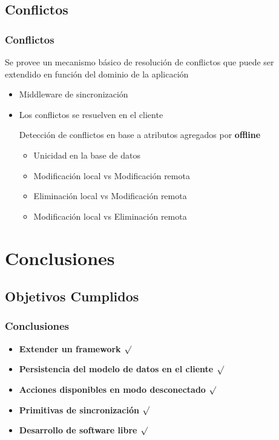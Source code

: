 \documentclass{beamer}
\begin{document}
\subsection{Conflictos}
\begin{frame}
    \frametitle{Conflictos}
    \par{
    Se provee un mecanismo básico de resolución de conflictos que 
    puede ser extendido en función del dominio de la aplicación
    }
    \begin{itemize}
      	\item{Middleware de sincronización}
        \item{Los conflictos se resuelven en el cliente}
        \begin{item}
        \par{
        	Detección de conflictos en base a atributos agregados por
        	{\bf offline}
        }
        \begin{itemize}
          \item{Unicidad en la base de datos}
          \item{Modificación local vs Modificación remota}
          \item{Eliminación local vs Modificación remota}
          \item{Modificación local vs Eliminación remota}
        \end{itemize}
        \end{item}        
    \end{itemize}
\end{frame}

\section{Conclusiones}
\subsection{Objetivos Cumplidos}
\begin{frame}
    \frametitle{Conclusiones}
    \begin{itemize}
        \item {\bf Extender un framework $\surd$}
        \item {\bf Persistencia del modelo de datos en el cliente $\surd$}
        \item {\bf Acciones disponibles en modo desconectado $\surd$}
        \item {\bf Primitivas de sincronización $\surd$}
        \item {\bf Desarrollo de software libre $\surd$}

    \end{itemize}
\end{frame}
\end{document}
